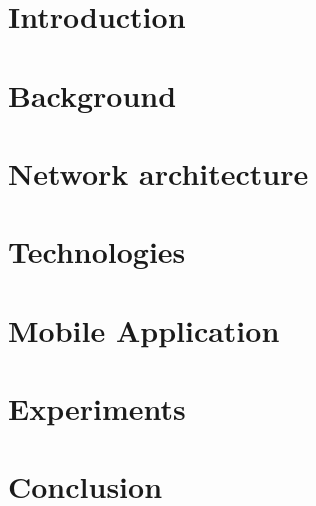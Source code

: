 \documentclass[english, a4paper, 11pt, twoside]{article}
\numberwithin{equation}{section} %
\begin{document}
\section{Introduction} %
\clearpage %

\section{Background}
    
\clearpage

\section{Network architecture}
    
\clearpage


\section{Technologies}
    
\clearpage

\section{Mobile Application}
    
\clearpage
  
\section{Experiments}
    
\clearpage

\section{Conclusion}
    
\clearpage

\newpage
\renewcommand\refname{References} %
{ %
}


%     
\end{document}
